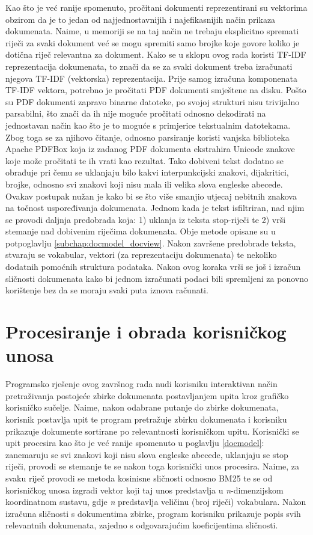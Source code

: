 \documentclass[times, utf8, zavrsni]{fer}
\begin{document}
Kao što je već ranije spomenuto, pročitani dokumenti reprezentirani su vektorima obzirom da je to jedan od  najjednostavnijih i najefikasnijih način prikaza dokumenata. Naime, u memoriji se na taj način ne trebaju eksplicitno spremati riječi za svaki dokument već se mogu spremiti samo brojke koje govore koliko je dotična riječ relevantna za dokument. Kako se u sklopu ovog rada koristi TF-IDF reprezentacija dokumenata, to znači da se za svaki dokument treba izračunati njegova TF-IDF (vektorska) reprezentacija. Prije samog izračuna komponenata TF-IDF vektora, potrebno je pročitati PDF dokumenti smještene na disku. Pošto su PDF dokumenti zapravo binarne datoteke, po svojoj strukturi nisu trivijalno parsabilni, što znači da ih nije moguće pročitati odnosno dekodirati na jednostavan način kao što je to moguće s primjerice tekstualnim datotekama. Zbog toga se za njihovo čitanje, odnosno parsiranje koristi vanjska biblioteka Apache PDFBox koja iz zadanog PDF dokumenta ekstrahira Unicode znakove koje može pročitati te ih vrati kao rezultat. Tako dobiveni tekst dodatno se obrađuje pri čemu se uklanjaju bilo kakvi interpunkcijski znakovi, dijakritici, brojke, odnosno svi znakovi koji nisu mala ili velika slova engleske abecede. Ovakav postupak nužan je kako bi se što više smanjio utjecaj nebitnih znakova na točnost uspoređivanja dokumenata.
Jednom kada je tekst isfiltriran, nad njim se provodi daljnja predobrada koja: 1) uklanja iz teksta stop-riječi te 2) vrši stemanje nad dobivenim riječima dokumenata. Obje metode opisane su u potpoglavlju
\ref{subchap:docmodel_docview}. Nakon završene predobrade teksta, stvaraju se vokabular, vektori (za reprezentaciju dokumenata) te nekoliko dodatnih pomoćnih struktura podataka. Nakon ovog koraka vrši se još i izračun sličnosti dokumenata kako bi jednom izračunati podaci bili spremljeni za ponovno korištenje bez da se moraju svaki puta iznova računati.

\section{Procesiranje i obrada korisničkog unosa}
Programsko rješenje ovog završnog rada nudi korisniku interaktivan način pretraživanja postojeće zbirke dokumenata postavljanjem upita kroz grafičko korisničko sučelje. Naime, nakon odabrane putanje do zbirke dokumenata, korisnik postavlja upit te program pretražuje zbirku dokumenata i korisniku prikazuje dokumente sortirane po relevantnosti korisničkom upitu.
Korisnički se upit procesira kao što je već ranije spomenuto u poglavlju \ref{docmodel}: zanemaruju se svi znakovi koji nisu slova engleske abecede, uklanjaju se stop riječi, provodi se stemanje te se nakon toga korisnički unos procesira. Naime, za svaku riječ provodi se metoda kosinisne sličnosti odnosno BM25 te se od korisničkog unosa izgradi vektor koji taj unos predstavlja u \textit{n}-dimenzijskom koordinatnom sustavu, gdje \textit{n} predstavlja veličinu (broj riječi) vokabulara. Nakon izračuna sličnosti s dokumentima zbirke, program korisniku prikazuje popis svih relevantnih dokumenata, zajedno s odgovarajućim koeficijentima sličnosti.
\end{document}
